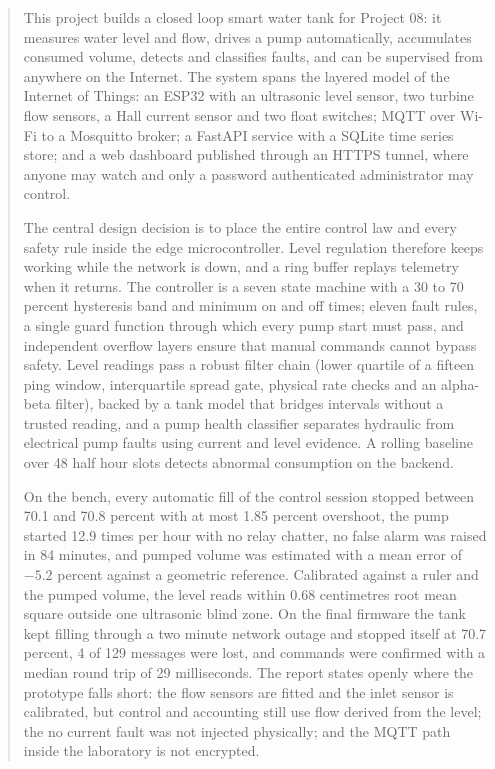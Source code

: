 \documentclass[a4paper, oneside, 13.5pt, top=2.5cm, bottom=2.5cm, left=3cm, right=2.5cm]{book}
\begin{document}
\begin{abstract}
\sloppy

This project builds a closed loop smart water tank for Project 08: it measures water level and flow, drives a pump automatically, accumulates consumed volume, detects and classifies faults, and can be supervised from anywhere on the Internet. The system spans the layered model of the Internet of Things: an ESP32 with an ultrasonic level sensor, two turbine flow sensors, a Hall current sensor and two float switches; MQTT over Wi-Fi to a Mosquitto broker; a FastAPI service with a SQLite time series store; and a web dashboard published through an HTTPS tunnel, where anyone may watch and only a password authenticated administrator may control.

The central design decision is to place the entire control law and every safety rule inside the edge microcontroller. Level regulation therefore keeps working while the network is down, and a ring buffer replays telemetry when it returns. The controller is a seven state machine with a 30 to 70 percent hysteresis band and minimum on and off times; eleven fault rules, a single guard function through which every pump start must pass, and independent overflow layers ensure that manual commands cannot bypass safety. Level readings pass a robust filter chain (lower quartile of a fifteen ping window, interquartile spread gate, physical rate checks and an alpha-beta filter), backed by a tank model that bridges intervals without a trusted reading, and a pump health classifier separates hydraulic from electrical pump faults using current and level evidence. A rolling baseline over 48 half hour slots detects abnormal consumption on the backend.

On the bench, every automatic fill of the control session stopped between 70.1 and 70.8 percent with at most 1.85 percent overshoot, the pump started 12.9 times per hour with no relay chatter, no false alarm was raised in 84 minutes, and pumped volume was estimated with a mean error of $-5.2$ percent against a geometric reference. Calibrated against a ruler and the pumped volume, the level reads within 0.68 centimetres root mean square outside one ultrasonic blind zone. On the final firmware the tank kept filling through a two minute network outage and stopped itself at 70.7 percent, 4 of 129 messages were lost, and commands were confirmed with a median round trip of 29 milliseconds. The report states openly where the prototype falls short: the flow sensors are fitted and the inlet sensor is calibrated, but control and accounting still use flow derived from the level; the no current fault was not injected physically; and the MQTT path inside the laboratory is not encrypted.

\end{abstract}
\newpage
\pagestyle{fancy}
\end{document}
